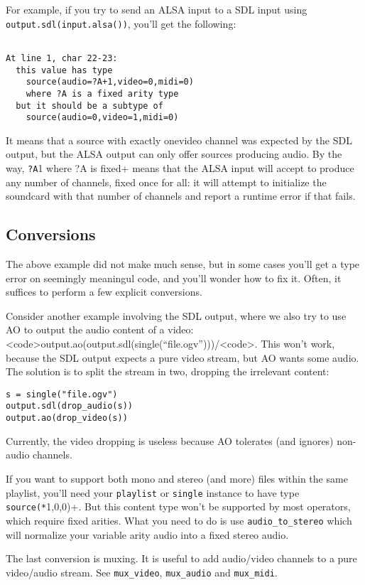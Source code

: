 For example, if you try to send an ALSA input to a SDL input using
\verb+output.sdl(input.alsa())+, you'll get the following:

\begin{verbatim}

At line 1, char 22-23:
  this value has type
    source(audio=?A+1,video=0,midi=0)
    where ?A is a fixed arity type
  but it should be a subtype of
    source(audio=0,video=1,midi=0)
\end{verbatim}
It means that a source with exactly onevideo channel was expected
by the SDL output, but the ALSA output can only offer sources
producing audio.
By the way,
\verb+?A+1 where ?A is fixed+ means that the ALSA input will
accept to produce any number of channels, fixed once for
all: it will attempt to initialize the soundcard with that number of
channels and report a runtime error if that fails.

\subsection{Conversions}
The above example did not make much sense, but in some cases you'll
get a type error on seemingly meaningul code, and you'll wonder how
to fix it. Often, it suffices to perform a few explicit conversions.

Consider another example involving the SDL output, where we also try
to use AO to output the audio content of a video:
<code>output.ao(output.sdl(single(``file.ogv'')))/<code>.
This won't work, because the SDL output expects a pure video stream,
but AO wants some audio. The solution is to split the stream in
two, dropping the irrelevant content:

\begin{verbatim}
s = single("file.ogv")
output.sdl(drop_audio(s))
output.ao(drop_video(s))
\end{verbatim}
Currently, the video dropping is useless because AO tolerates
(and ignores) non-audio channels.

If you want to support both mono and stereo (and more) files within
the same playlist, you'll need your \verb+playlist+
or \verb+single+ instance to have type
\verb+source(*+1,0,0)+.
But this content type won't be supported by most operators, which
require fixed arities. What you need to do is use \verb+audio_to_stereo+
which will normalize your variable arity audio into a fixed stereo audio.

The last conversion is muxing.
It is useful to add audio/video channels to a pure video/audio stream.
See \verb+mux_video+, \verb+mux_audio+ and \verb+mux_midi+.

